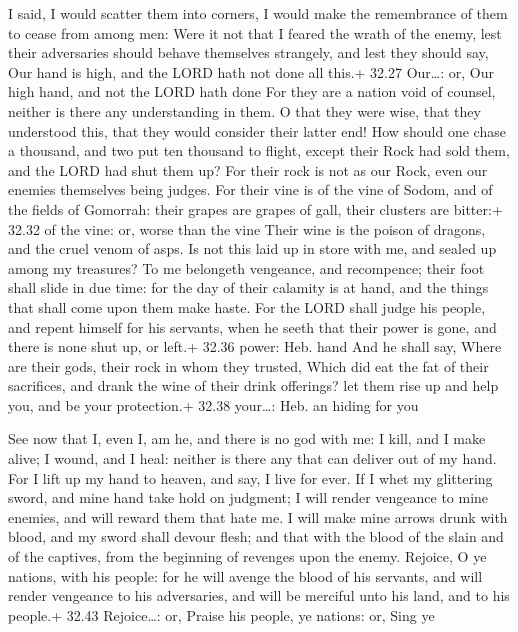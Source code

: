  I said, I would scatter them into corners, I would make
the remembrance of them to cease from among men:  Were it
not that I feared the wrath of the enemy, lest their adversaries should
behave themselves strangely, and lest they should say, Our hand is high,
and the LORD hath not done all this.+ 32.27 Our\ldots: or, Our high
hand, and not the LORD hath done  For they are a nation
void of counsel, neither is there any understanding in them.
 O that they were wise, that they understood this, that
they would consider their latter end!  How should one chase
a thousand, and two put ten thousand to flight, except their Rock had
sold them, and the LORD had shut them up?  For their rock
is not as our Rock, even our enemies themselves being judges.
 For their vine is of the vine of Sodom, and of the fields
of Gomorrah: their grapes are grapes of gall, their clusters are
bitter:+ 32.32 of the vine: or, worse than the vine  Their
wine is the poison of dragons, and the cruel venom of asps.
 Is not this laid up in store with me, and sealed up among
my treasures?  To me belongeth vengeance, and recompence;
their foot shall slide in due time: for the day of their calamity is at
hand, and the things that shall come upon them make haste. 
For the LORD shall judge his people, and repent himself for his
servants, when he seeth that their power is gone, and there is none shut
up, or left.+ 32.36 power: Heb. hand  And he shall say,
Where are their gods, their rock in whom they trusted, 
Which did eat the fat of their sacrifices, and drank the wine of their
drink offerings? let them rise up and help you, and be your protection.+
32.38 your\ldots: Heb. an hiding for you

 See now that I, even I, am he, and there is no god with
me: I kill, and I make alive; I wound, and I heal: neither is there any
that can deliver out of my hand.  For I lift up my hand to
heaven, and say, I live for ever.  If I whet my glittering
sword, and mine hand take hold on judgment; I will render vengeance to
mine enemies, and will reward them that hate me.  I will
make mine arrows drunk with blood, and my sword shall devour flesh; and
that with the blood of the slain and of the captives, from the beginning
of revenges upon the enemy.  Rejoice, O ye nations, with
his people: for he will avenge the blood of his servants, and will
render vengeance to his adversaries, and will be merciful unto his land,
and to his people.+ 32.43 Rejoice\ldots: or, Praise his people, ye
nations: or, Sing ye

